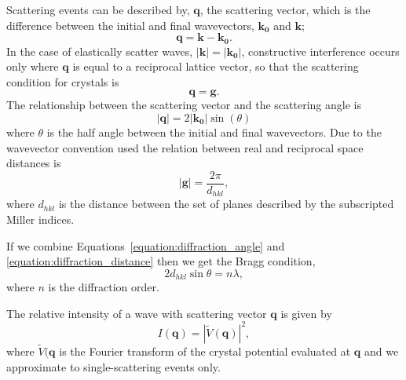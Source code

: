 Scattering events can be described by, $\mathbf{q}$, the scattering vector, which is the difference between the initial and final wavevectors, $\mathbf{k_0}$ and $\mathbf{k}$;
\begin{equation}
\mathbf{q} = \mathbf{k} - \mathbf{k_0}.
\end{equation}
In the case of elastically scatter waves, $|\mathbf{k}| = |\mathbf{k_0}|$, constructive interference occurs only where $\mathbf{q}$ is equal to a reciprocal lattice vector, so that the scattering condition for crystals is
\begin{equation}
\mathbf{q} = \mathbf{g}.
\end{equation}
The relationship between the scattering vector and the scattering angle is
\begin{equation}\label{equation:diffraction_angle}
\left|\mathbf{q}\right| = 2\left|\mathbf{k_0}\right|\sin(\theta)
\end{equation}
where $\theta$ is the half angle between the initial and final wavevectors.
Due to the wavevector convention used the relation between real and reciprocal space distances is
\begin{equation}\label{equation:diffraction_distance}
\left|\mathbf{g}\right| = \frac{2\pi}{d_{hkl}},
\end{equation}
where $d_{hkl}$ is the distance between the set of planes described by the subscripted Miller indices.

If we combine Equations~\ref{equation:diffraction_angle} and \ref{equation:diffraction_distance} then we get the Bragg condition,
\begin{equation}
2d_{hkl}\sin\theta = n\lambda,
\end{equation}
where $n$ is the diffraction order.

The relative intensity of a wave with scattering vector $\mathbf{q}$ is given by
\begin{equation}
I(\mathbf{q}) = \left|\tilde{V}(\mathbf{q})\right|^2,
\end{equation}
where $\tilde{V}(\mathbf{q}$ is the Fourier transform of the crystal potential evaluated at $\mathbf{q}$ and we approximate to single-scattering events only.

